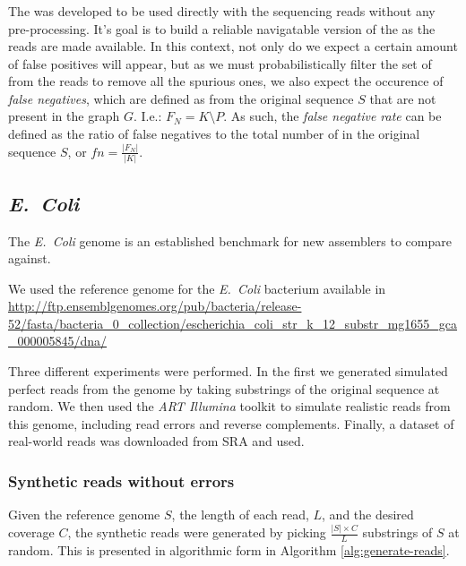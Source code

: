 \subsubsection{\dBCM}

The \dBCM was developed to be used directly with the sequencing reads without any pre-processing. It's goal is to build a reliable
navigatable version of the \dBG as the reads are made available. In this context, not only do we expect a certain amount of false
positives will appear, but as we must probabilistically filter the set of \kmers from the reads to remove all the spurious ones, we
also expect the occurence of \emph{false negatives}, which are defined as \kmers from the original sequence $S$ that are not present
in the graph $G$. I.e.: $F_N=K \setminus P$. As such, the \emph{false negative rate} can be defined as the ratio of false negatives
to the total number of \kmers in the original sequence $S$, or $\mathit{fn}=\frac{|F_N|}{|K|}$.

\subsubsection{\dBHT}

\subsection{\emph{E.~Coli}}

The \emph{E.~Coli} genome is an established benchmark for new assemblers to compare against.

We used the reference genome for the \emph{E.~Coli} bacterium available in \url{http://ftp.ensemblgenomes.org/pub/bacteria/release-52/fasta/bacteria_0_collection/escherichia_coli_str_k_12_substr_mg1655_gca_000005845/dna/}

Three different experiments were performed. In the first we generated simulated perfect reads from the genome by taking substrings of 
the original sequence at random. We then used the \emph{ART Illumina} toolkit  to simulate realistic reads from this
genome, including read errors and reverse complements. Finally, a dataset of real-world reads was downloaded from SRA \cite{Leinonen2011}
and used.

\subsubsection{Synthetic reads without errors}

Given the reference genome $S$, the length of each read, $L$, and the desired coverage $C$, the synthetic reads were generated by picking
$\frac{|S| \times C}{L}$ substrings of $S$ at random. This is presented in algorithmic form in Algorithm \ref{alg:generate-reads}.


